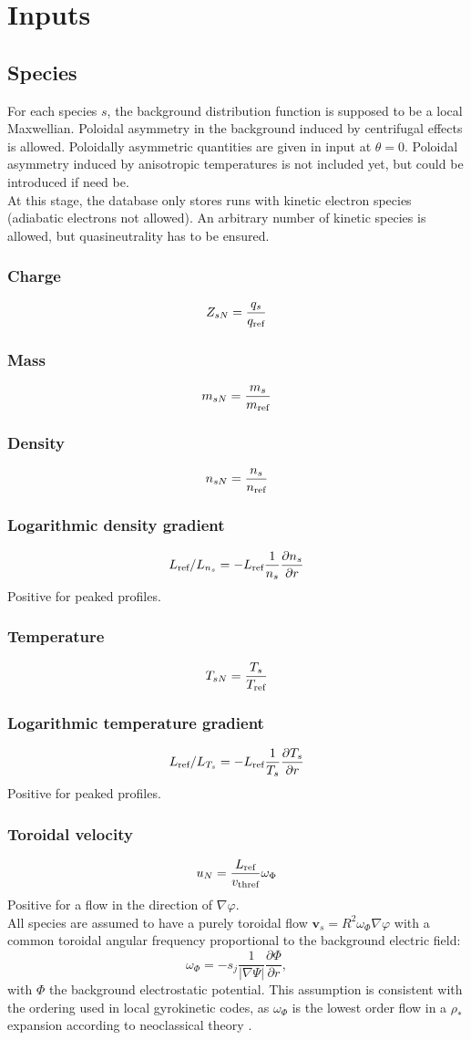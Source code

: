 \documentclass[fleqn]{report}
\begin{document}
\chapter{Inputs}
\section{Species}
For each species $s$, the background distribution function is supposed to be a local Maxwellian. Poloidal asymmetry in the background induced by centrifugal effects is allowed. Poloidally asymmetric quantities are given in input at $\theta=0$. Poloidal asymmetry induced by anisotropic temperatures is not included yet, but could be introduced if need be.\\ 
At this stage, the database only stores runs with kinetic electron species (adiabatic electrons not allowed). An arbitrary number of kinetic species is allowed, but quasineutrality has to be ensured.

\subsection{Charge}
$$Z_{sN}=\frac{q_s}{q_{\textrm{ref}}}$$
\subsection{Mass}
$$m_{sN}=\frac{m_s}{m_{\textrm{ref}}}$$
\subsection{Density}
$$n_{sN}=\frac{n_s}{n_{\textrm{ref}}}$$
\subsection{Logarithmic density gradient}
$$L_{\textrm{ref}}/L_{n_s}=-L_{\textrm{ref}} \frac{1}{n_s}\frac{\partial n_s}{\partial r}$$
Positive for peaked profiles. 
\subsection{Temperature}
$$T_{sN}=\frac{T_s}{T_{\textrm{ref}}}$$
\subsection{Logarithmic temperature gradient}
$$L_{\textrm{ref}}/L_{T_s}=-L_{\textrm{ref}} \frac{1}{T_s}\frac{\partial T_s}{\partial r}$$
Positive for peaked profiles.
\subsection{Toroidal velocity}
$$u_{N}=\frac{L_{\textrm{ref}}}{v_\textrm{thref}}\omega_{\Phi}$$
Positive for a flow in the direction of $\nabla \varphi$.\\
All species are assumed to have a purely toroidal flow $\mathbf{v}_s=R^2\omega_\Phi\nabla \varphi$ with a common toroidal angular frequency proportional to the background electric field:
$$\omega_{\Phi}=-s_j\frac{1}{|\nabla \Psi|}\frac{\partial \Phi}{\partial r},$$
with $\Phi$ the background electrostatic potential. This assumption is consistent with the ordering used in local gyrokinetic codes, as $\omega_\Phi$ is the lowest order flow in a $\rho_*$ expansion according to neoclassical theory \cite{Hirshman:NF1981}.
\end{document}

